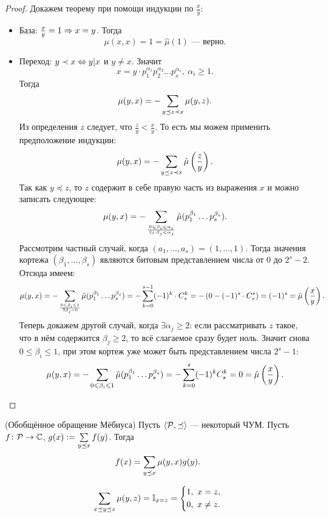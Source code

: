 \begin{proof}
	Докажем теорему при помощи индукции по $\frac{x}{y}$:
	\begin{itemize}
		\item База: $\frac{x}{y} = 1 \Rightarrow x = y$. Тогда
		\[
			\mu(x, x) = 1 = \hat{\mu}(1) \text{ --- верно}.
		\]
		
		\item Переход: $y \prec x \Leftrightarrow y | x$ и $y \neq x$. Значит
		\[
			x = y \cdot p_1^{\alpha_1} p_2^{\alpha_2} \ldots p_s^{\alpha_s},\ \alpha_i \ge 1.
		\]
		Тогда
		\[
			\mu(y, x) = -\sum\limits_{y \preceq z \prec x} \mu(y, z).
		\]
		Из определения $z$ следует, что $\frac{z}{y} < \frac{x}{y}$. То есть мы можем применить предположение индукции:
		\[
			\mu(y, x) = -\sum\limits_{y \preceq z \prec x} \hat{\mu}\left(\frac{z}{y}\right).
		\]
		Так как $y \preceq z$, то $z$ содержит в себе правую часть из выражения $x$ и можно записать следующее:
		\[
			\mu(y, x) = -\sum\limits_{{0 \leqslant \beta_i \leqslant \alpha_i} \over {\exists j : \beta_j < \alpha_j}} \hat{\mu}(p_1^{\beta_1} \ldots p_s^{\beta_s}).
		\]
		Рассмотрим частный случай, когда $(a_1, \ldots, a_s) = (1, \ldots, 1)$. Тогда значения кортежа $(\beta_1, \ldots, \beta_s)$ являются битовым представлением числа от $0$ до $2^s - 2$. Отсюда имеем:
		\[
			\mu(y, x) = -\sum\limits_{{0 \leqslant \beta_i \leqslant 1} \over {\exists \beta_j = 0}} \hat{\mu}(p_1^{\beta_1} \ldots p_s^{\beta_s}) = -\sum\limits_{k = 0}^{s - 1} (-1)^k \cdot C_s^k = - \left(0 - (-1)^s \cdot C_s^s\right) = (-1)^s = \hat{\mu}\left(\frac{x}{y}\right).
		\]
		Теперь докажем другой случай, когда $\exists \alpha_j \ge 2$: если рассматривать $z$ такое, что в нём содержится $\beta_j \ge 2$, то всё слагаемое сразу будет ноль. Значит снова $0 \le \beta_i \le 1$, при этом кортеж уже может быть представлением числа $2^s - 1$:
		\[
			\mu(y, x) = -\sum\limits_{{0 \leqslant \beta_i \leqslant 1}} \hat{\mu}(p_1^{\beta_1} \ldots p_s^{\beta_s}) = -\sum\limits_{k = 0}^s (-1)^k C_s^k = 0 = \hat{\mu}\left(\frac{x}{y}\right).
		\]
	\end{itemize}
\end{proof}

\begin{theorem} (Обобщённое обращение Мёбиуса) \label{globMebius}
	Пусть $\langle\mathcal{P}, \preceq\rangle$ --- некоторый ЧУМ. Пусть $f\colon \mathcal{P} \rightarrow \mathbb{C}$, $g(x) := \sum\limits_{y \preceq x} f(y)$. Тогда
	\[
		f(x) = \sum\limits_{y \preceq x} \mu(y, x) g(y).
	\]
\end{theorem}

\begin{lemma}
	\[
		\sum\limits_{x \preceq y \preceq z} \mu(y, z) = \mathbb{I}_{x = z} = \left\{\begin{aligned}
			&{1,\ x = z,}
			\\
			&{0,\ x \neq z.}
		\end{aligned}\right.
	\]
\end{lemma}

